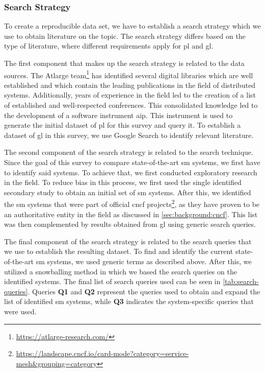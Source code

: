 \subsubsection{Search Strategy}
\label{sec:survey:methodology:review-protocol:search-strategy}

To create a reproducible data set, we have to establish a search strategy which we use to obtain literature on the topic. The search strategy differs based on the type of literature, where different requirements apply for \gls{pl} and \gls{gl}.


The first component that makes up the search strategy is related to the data sources. The Atlarge  team\footnote{\url{https://atlarge-research.com/}} has identified several digital libraries which are well established and which contain the leading publications in the field of distributed systems. Additionally, years of experience in the field led to the creation of a list of established and well-respected conferences. This consolidated knowledge led to the development of a software instrument \gls{aip}. This instrument is used to generate the initial dataset of \gls{pl} for this survey and query it. To establish a dataset of \gls{gl} in this survey, we use Google Search to identify relevant literature.

The second component of the search strategy is related to the search technique. Since the goal of this survey to compare state-of-the-art \gls{sm} systems, we first have to identify said systems. To achieve that, we first conducted exploratory research in the field. To reduce bias in this process, we first used the single identified secondary study \cite{service-mesh-survey} to obtain an initial set of \gls{sm} systems. After this, we identified the \gls{sm} systems that were part of official \gls{cncf} projects\footnote{\url{https://landscape.cncf.io/card-mode?category=service-mesh&grouping=category}}, as they have proven to be an authoritative entity in the field as discussed in \cref{sec:background:cncf}. This list was then complemented by results obtained from \gls{gl} using generic search queries. 


The final component of the search strategy is related to the search queries that we use to establish the resulting dataset. To find and identify the current state-of-the-art \gls{sm} systems, we used generic terms as described above. After this, we utilized a snowballing method in which we based the search queries on the identified systems. The final list of search queries used can be seen in \cref{tab:search-queries}. Queries \textbf{Q1} and \textbf{Q2} represent the queries used to obtain and expand the list of identified \gls{sm} systems, while \textbf{Q3} indicates the system-specific queries that were used. 

